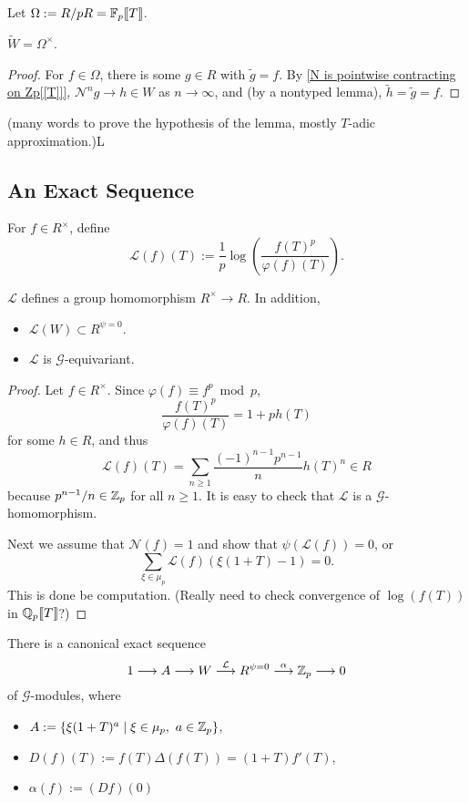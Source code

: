 Let $\Omega := R/pR = \mathbb{F}_p\llbracket T \rrbracket$.
\begin{lemma}
    $\widetilde W = \Omega^\times$.
\end{lemma}
\begin{proof}
    For $f\in \Omega$,
    there is some $g\in R$ with $\tilde g = f$.
    By \cref{N is pointwise contracting on Zp[[T]]},
    $\mathcal N^ng\to h\in W$ as $n\to\infty$,
    and (by a nontyped lemma), $\tilde h = \tilde g = f$.
\end{proof}
(many words to prove the hypothesis of the lemma, mostly $T$-adic approximation.)L


\subsection{An Exact Sequence}

For $f\in R^\times$,
define \[\mathcal{L}(f)(T) := \frac{1}{p}\log\left( \frac{f(T)^p}{\varphi(f)(T)} \right).\]
\begin{lemma}
    $\mathcal{L}$ defines a group homomorphism $R^\times\to R$. In addition,
    \begin{itemize}
\item $\mathcal{L}(W)\subset R^{\psi = 0}$.
\item $\mathcal{L}$ is $\mathcal{G}$-equivariant.
    \end{itemize}
\end{lemma}
\begin{proof}
    Let $f\in R^\times$.
    Since $\varphi(f)\equiv f^p\bmod p$,
    \[\frac{f(T)^p}{\varphi(f)(T)} = 1 + ph(T)\]
    for some $h\in R$,
    and thus \[\mathcal{L}(f)(T) = \sum_{n\ge 1}\frac{(-1)^{n-1}p^{n-1}}{n}h(T)^n\in R\]
    because $p^{n-1}/n\in\mathbb{Z}_p$ for all $n\ge 1$.
    It is easy to check that $\mathcal{L}$ is a $\mathcal{G}$-homomorphism.

    Next we assume that $\mathcal{N}(f) = 1$ and show that $\psi(\mathcal{L}(f)) = 0$, or \[\sum_{\xi\in\mu_p} \mathcal{L}(f)(\xi(1 + T) - 1) = 0.\]
    This is done be computation. (Really need to check convergence of $\log(f(T))$ in $\mathbb{Q}_p\llbracket T \rrbracket$?)
\end{proof}

\begin{theorem}\label{canonical exact sequence involving N = 1 to psi = 0}
    There is a canonical exact sequence
    \[1\longrightarrow A\longrightarrow W\stackrel{\mathcal{L}}{\longrightarrow}R^{\psi = 0}\stackrel{\alpha}{\longrightarrow}  \mathbb{Z}_p\longrightarrow 0\]of $\mathcal{G}$-modules,
    where\begin{itemize}
    \item $A := \{\xi(1 + T)^a\mid \xi\in\mu_p,\ a\in\Z_p\}$,
    \item $D(f)(T) := f(T)\Delta(f(T)) = (1 + T)f'(T)$,
    \item $\alpha(f) := (Df)(0)$
    \end{itemize}
\end{theorem}

